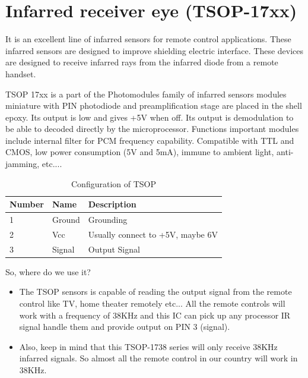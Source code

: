 \documentclass[a4paper]{report}
\begin{document}
    \section{Infarred receiver eye (TSOP-17xx)}
        It is an excellent line of infarred sensors for remote control applications. These infarred 
        sensors are designed to improve shielding electric interface. These devices are designed to 
        receive infarred rays from the infarred diode from a remote handset. 
        \linebreak
        \par TSOP 17xx is a part of the Photomodules family of infarred sensors modules miniature with PIN 
        photodiode and preamplification stage are placed in the shell epoxy. Its output is low and 
        gives +5V when off. Its output is demodulation to be able to decoded directly by the microprocessor. 
        Functions important modules include internal filter for PCM frequency capability. Compatible 
        with TTL and CMOS, low power consumption (5V and 5mA), immune to ambient light, anti-jamming, etc....
        \begin{table}[ht]
            \centering
            \begin{tabular} { | l | l | l | }
                \hline
                Number & Name & Description \\ \hline
                1 & Ground & Grounding \\ \hline
                2 & Vcc & Usually connect to +5V, maybe 6V \\ \hline
                3 & Signal & Output Signal \\
                \hline
            \end{tabular}
            \caption{\label{tab:second}Configuration of TSOP}
        \end{table}
        \par So, where do we use it?
        \linebreak
        \begin{itemize}
            \item The TSOP sensors is capable of reading the output signal from the remote control like 
            TV, home theater remotely etc... All the remote controls will work with a frequency of 38KHz and 
            this IC can pick up any processor IR signal handle them and provide output on PIN 3 (signal).
            \item Also, keep in mind that this TSOP-1738 series will only receive 38KHz infarred signals. 
            So almost all the remote control in our country will work in 38KHz.
        \end{itemize}
\end{document}
